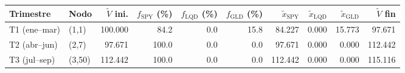 {\footnotesize
\begin{tabular}{llrrrrrrrr}
\toprule
Trimestre & Nodo & $\tilde V$ ini. & $f_{\mathrm{SPY}}$ (\%) & $f_{\mathrm{LQD}}$ (\%) & $f_{\mathrm{GLD}}$ (\%) & $\tilde x_{\mathrm{SPY}}$ & $\tilde x_{\mathrm{LQD}}$ & $\tilde x_{\mathrm{GLD}}$ & $\tilde V$ fin \\
\midrule
T1 (ene–mar) & (1,1) & 100.000 & 84.2 & 0.0 & 15.8 & 84.227 & 0.000 & 15.773 & 97.671 \\
T2 (abr–jun) & (2,7) & 97.671 & 100.0 & 0.0 & 0.0 & 97.671 & 0.000 & 0.000 & 112.442 \\
T3 (jul–sep) & (3,50) & 112.442 & 100.0 & 0.0 & 0.0 & 112.442 & 0.000 & 0.000 & 115.116 \\
\bottomrule
\end{tabular}
}
